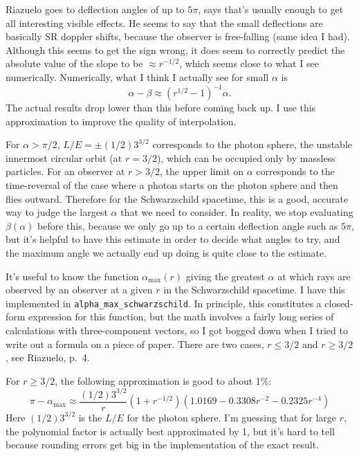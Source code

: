 \documentclass{article}
\begin{document}
Riazuelo goes to deflection angles of up to $5\pi$, says that's usually enough to
get all interesting visible effects. He seems to say that the small deflections are basically
SR doppler shifts, because the observer is free-falling (same idea I had). Although this seems to get the sign
wrong, it does seem to correctly predict the absolute value of the slope to be $\approx r^{-1/2}$,
which seems close to what I see numerically. Numerically, what I think I actually see for
small $\alpha$ is
\begin{equation*}
  \alpha-\beta\approx (r^{1/2}-1)^{-1}\alpha.
\end{equation*}
The actual results drop lower than this before coming back up. I use this approximation to
improve the quality of interpolation.

For $\alpha>\pi/2$, $L/E=\pm (1/2)3^{3/2}$ corresponds to the photon sphere, the unstable innermost
circular orbit (at $r=3/2$), which can be occupied only by massless particles. For an observer at $r>3/2$,
the upper limit on $\alpha$ corresponds to the time-reversal of the case where a photon starts on
the photon sphere and then flies outward. Therefore for the Schwarzschild spacetime, this is a good,
accurate way to judge the largest $\alpha$ that we need to consider. In reality, we stop evaluating
$\beta(\alpha)$ before this, because we only go up to a certain deflection angle such as $5\pi$,
but it's helpful to have this estimate in order to decide what angles to try, and the maximum angle
we actually end up doing is quite close to the estimate.

It's useful to know the function $\alpha_\text{max}(r)$ giving the greatest $\alpha$ at which rays
are observed by an observer at a given $r$ in the Schwarzschild spacetime. I have this
implemented in \texttt{alpha\_max\_schwarzschild}. In principle, this constitutes a 
closed-form expression for this function, but the math involves a fairly long series of calculations with
three-component vectors, so I got bogged down when I tried to write out a formula on a piece of
paper. There are two cases, $r\le 3/2$ and $r\ge 3/2$, see Riazuelo, p.~4.

For $r\ge 3/2$, the following approximation is good to about 1\%:
\begin{equation*}
  \pi-\alpha_\text{max} \approx \frac{(1/2)3^{3/2}}{r}(1+r^{-1/2})(1.0169-0.3308r^{-2}-0.2325r^{-4})
\end{equation*}
Here $(1/2)3^{3/2}$ is the $L/E$ for the photon sphere. 
I'm guessing that for large $r$, the polynomial factor is actually best approximated by 1,
but it's hard to tell because rounding errors get big in the implementation of the exact result.
\end{document}
